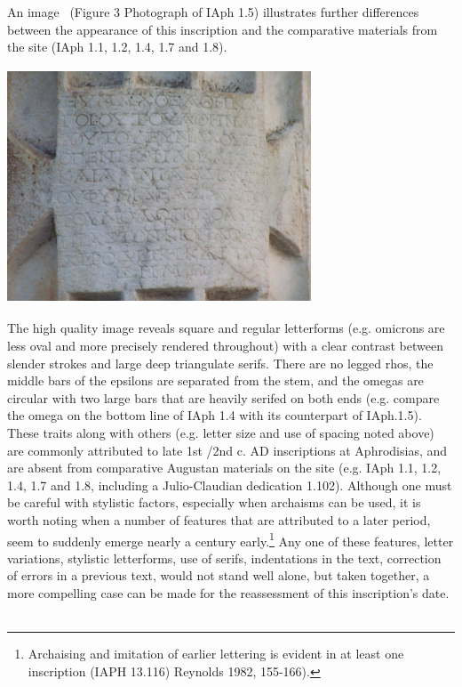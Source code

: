 \documentclass[amsthm,ebook]{saparticle}
\begin{document}
\bigskip


\bigskip


\bigskip


\bigskip


\bigskip


\bigskip

An image \ (Figure 3 Photograph of IAph 1.5) illustrates further differences between the appearance of this inscription
and the comparative materials from the site (IAph 1.1, 1.2, 1.4, 1.7 and 1.8). 


\bigskip


\bigskip

 \includegraphics[width=9.036cm,height=6.985cm]{PaperproposalforEAGLEfinal-img003.jpg} 

The high quality image reveals square and regular letterforms (e.g. omicrons are less oval and more precisely rendered
throughout) with a clear contrast between slender strokes and large deep triangulate serifs. There are no legged rhos,
the middle bars of the epsilons are separated from the stem, and the omegas are circular with two large bars that are
heavily serifed on both ends (e.g. compare the omega on the bottom line of IAph 1.4 with its counterpart of IAph.1.5).
These traits along with others (e.g. letter size and use of spacing noted above) are commonly attributed to late 1st
/2nd c. AD inscriptions at Aphrodisias, and are absent from comparative Augustan materials on the site (e.g. IAph 1.1,
1.2, 1.4, 1.7 and 1.8, including a Julio-Claudian dedication 1.102). Although one must be careful with stylistic
factors, especially when archaisms can be used, it is worth noting when a number of features that are attributed to a
later period, seem to suddenly emerge nearly a century early.\footnote{ Archaising and imitation of earlier lettering
is evident in at least one inscription (IAPH 13.116) Reynolds 1982, 155-166). } Any one of these features, letter
variations, stylistic letterforms, use of serifs, indentations in the text, correction of errors in a previous text,
would not stand well alone, but taken together, a more compelling case can be made for the reassessment of this
inscription’s date. \ 
\end{document}

